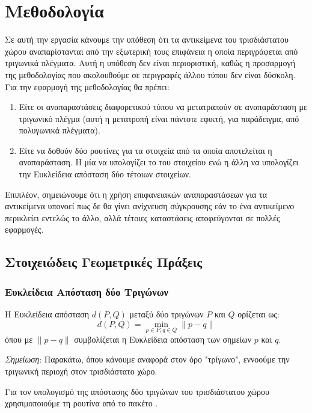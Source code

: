 \chapter{Μεθοδολογία}
\label{ch:methodology}

Σε αυτή την εργασία κάνουμε την υπόθεση ότι τα αντικείμενα του 
τρισδιάστατου χώρου αναπαρίστανται από την εξωτερική τους επιφάνεια 
η οποία περιγράφεται από τριγωνικά πλέγματα. 
Αυτή η υπόθεση δεν είναι περιοριστική, καθώς η προσαρμογή της μεθοδολογίας 
που ακολουθούμε σε περιγραφές άλλου τύπου δεν είναι δύσκολη.
Για την εφαρμογή της μεθοδολογίας θα πρέπει:
\begin{enumerate}
    \item Είτε οι αναπαραστάσεις διαφορετικού τύπου να μετατραπούν σε αναπαράσταση 
    με τριγωνικό πλέγμα (αυτή η μετατροπή είναι πάντοτε εφικτή, για παράδειγμα, 
    από πολυγωνικά πλέγματα).
    \item Είτε να δοθούν δύο ρουτίνες για τα στοιχεία από τα οποία αποτελείται η 
    αναπαράσταση. Η μία να υπολογίζει το  του στοιχείου 
    ενώ η άλλη να υπολογίζει την Ευκλείδεια απόσταση δύο τέτοιων στοιχείων.
\end{enumerate}
Επιπλέον, σημειώνουμε ότι η χρήση επιφανειακών αναπαραστάσεων για τα αντικείμενα 
υπονοεί πως δε θα γίνει ανίχνευση σύγκρουσης εάν το ένα αντικείμενο περικλείει 
εντελώς το άλλο, αλλά τέτοιες καταστάσεις αποφεύγονται σε πολλές εφαρμογές.


\section{Στοιχειώδεις Γεωμετρικές Πράξεις}
\subsection{Ευκλείδεια Απόσταση δύο Τριγώνων}
\label{subsec:tria_distance}
Η Ευκλείδεια απόσταση $d(P,Q)$ μεταξύ δύο τριγώνων $P$ και $Q$
ορίζεται ως:
\[ d(P,Q) = \min_{p \in P, q \in Q} \lVert p - q \rVert \]
όπου με $\lVert p - q \rVert$ συμβολίζεται η Ευκλείδεια 
απόσταση των σημείων $p$ και $q$.

\textit{Σημείωση}: Παρακάτω, όπου κάνουμε αναφορά στον όρο "τρίγωνο",
εννοούμε την τριγωνική περιοχή στον τρισδιάστατο χώρο.

Για τον υπολογισμό της απόστασης δύο τριγώνων του τρισδιάστατου χώρου 
χρησιμοποιούμε τη ρουτίνα  από το πακέτο 
 \cite{larsen2014pqp} \cite{larsen1999fast}. 

